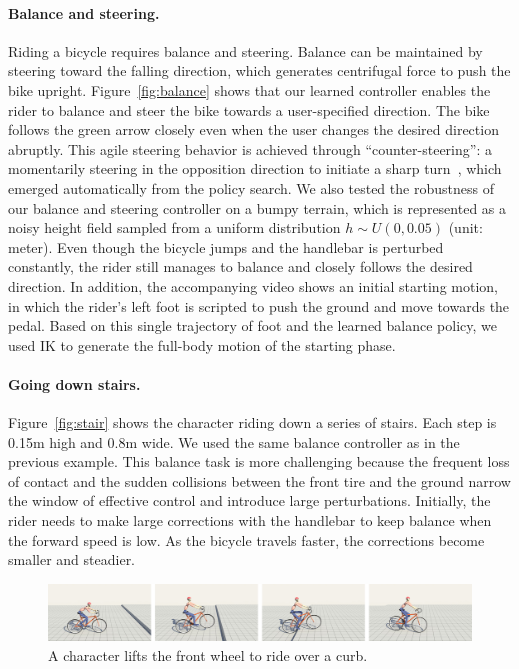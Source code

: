 \paragraph{Balance and steering.} Riding a bicycle requires balance and steering. Balance can be maintained by steering toward the falling direction, which generates centrifugal force to push the bike upright. Figure~\ref{fig:balance} shows that our learned controller enables the rider to balance and steer the bike towards a user-specified direction. The bike follows the green arrow closely even when the user changes the desired direction abruptly. This agile steering behavior is achieved through ``counter-steering'': a momentarily steering in the opposition direction to initiate a sharp turn~\cite{Rankine1870}, which emerged automatically from the policy search. We also tested the robustness of our balance and steering controller on a bumpy terrain, which is represented as a noisy height field sampled from a uniform distribution $h\sim U(0, 0.05)$ (unit: meter). Even though the bicycle jumps and the handlebar is perturbed constantly, the rider still manages to balance and closely follows the desired direction. In addition, the accompanying video shows an initial starting motion, in which the rider's left foot is scripted to push the ground and move towards the pedal. Based on this single trajectory of foot and the learned balance policy, we used IK to generate the full-body motion of the starting phase.

\paragraph{Going down stairs.} Figure~\ref{fig:stair} shows the character riding down a series of stairs. Each step is 0.15m high and 0.8m wide. We used the same balance controller as in the previous example. This balance task is more challenging because the frequent loss of contact and the sudden collisions between the front tire and the ground narrow the window of effective control and introduce large perturbations. Initially, the rider needs to make large corrections with the handlebar to keep balance when the forward speed is low. As the bicycle travels faster, the corrections become smaller and steadier.

\begin{figure}[!t]
\centering
\includegraphics[width=\textwidth]{figures/Curb}
\caption{A character lifts the front wheel to ride over a curb.}
\label{fig:curb}
\end{figure}

